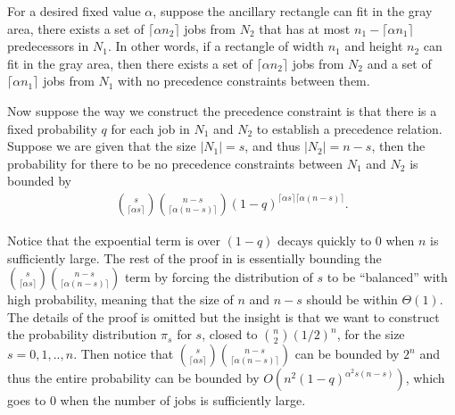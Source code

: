 For a desired fixed value $\alpha$, suppose the ancillary rectangle can fit in the gray area, there exists a set of $\lceil\alpha n_2\rceil$ jobs from $N_2$ that has at most $n_1 - \lceil\alpha n_1\rceil$ predecessors in $N_1$. In other words, if a rectangle of width $n_1$ and height $n_2$ can fit in the gray area, then there exists a set of $\lceil\alpha n_2\rceil$ jobs from $N_2$ and a set of $\lceil\alpha n_1\rceil$  jobs from $N_1$ with no precedence constraints between them.

Now suppose the way we construct the precedence constraint is that there is a fixed probability $q$ for each job in $N_1$ and $N_2$ to establish a precedence relation. Suppose we are given that the size $|N_1| = s$, and thus $|N_2| = n-s$, then the probability for there to be no precedence constraints between $N_1$ and $N_2$ is bounded by
\begin{align}
{s \choose \lceil\alpha s\rceil}{n-s \choose \lceil\alpha (n-s)\rceil}(1-q)^{ \lceil\alpha s\rceil \lceil\alpha (n-s)\rceil}. \label{eq:constructtwoclass}
\end{align}

Notice that the expoential term is over $(1-q)$ decays quickly to $0$ when $n$ is sufficiently large. The rest of the proof in \cite{schulz2011near} is essentially bounding the ${s \choose \lceil\alpha s\rceil}{n-s \choose \lceil\alpha (n-s)\rceil}$ term by forcing the distribution of $s$ to be ``balanced'' with high probability, meaning that the size of $n$ and $n-s$ should be within $\Theta(1)$. The details of the proof is omitted but the insight is that we want to construct the probability distribution $\pi_s$ for $s$, closed to ${n \choose 2} (1/2)^n$, for the size $s=0,1,..,n$. Then notice that ${s \choose \lceil\alpha s\rceil}{n-s \choose \lceil\alpha (n-s)\rceil}$ can be bounded by $2^n$ and thus the entire probability can be bounded by $O(n^2 (1-q)^{\alpha^2 s(n-s)})$, which goes to 0 when the number of jobs is sufficiently large. 